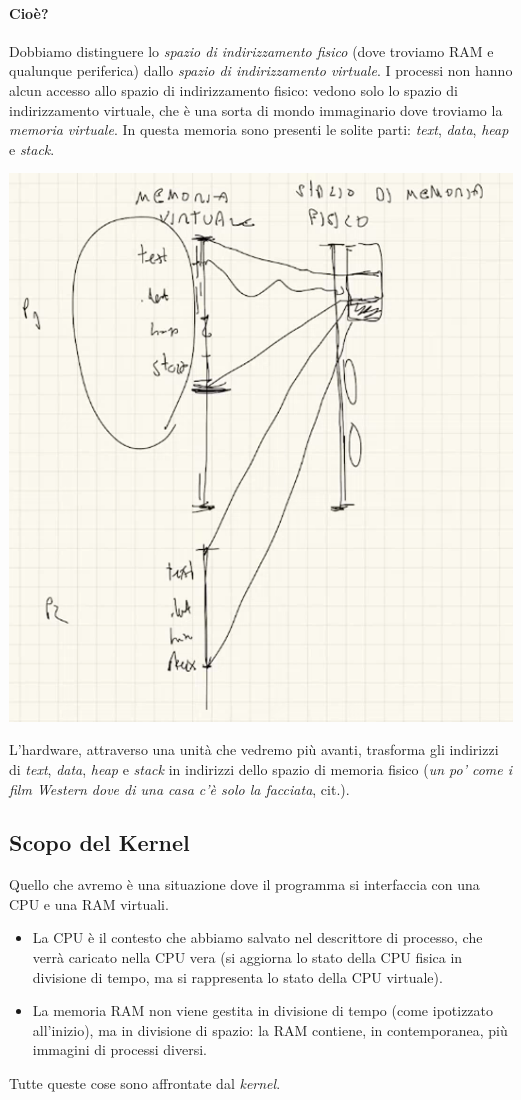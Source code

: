 \paragraph{Cioè?} Dobbiamo distinguere lo \emph{spazio di indirizzamento fisico} (dove troviamo RAM e qualunque periferica) dallo \emph{spazio di indirizzamento virtuale}. I processi non hanno alcun accesso allo spazio di indirizzamento fisico: vedono solo lo spazio di indirizzamento virtuale, che è una sorta di mondo immaginario dove troviamo la \emph{memoria virtuale}. In questa memoria sono presenti le solite parti: \emph{text}, \emph{data}, \emph{heap} e \emph{stack}.
\begin{center}
	\includegraphics[scale=.65]{img/209.PNG}
\end{center} 
L'hardware, attraverso una unità che vedremo più avanti, trasforma gli indirizzi di \emph{text}, \emph{data}, \emph{heap} e \emph{stack} in indirizzi dello spazio di memoria fisico (\textit{un po' come i film Western dove di una casa c'è solo la facciata}, cit.).
\subsection{Scopo del Kernel} Quello che avremo è una situazione dove il programma si interfaccia con una CPU e una RAM virtuali.
\begin{itemize}
	\item La CPU è il contesto che abbiamo salvato nel descrittore di processo, che verrà caricato nella CPU vera (si aggiorna lo stato della CPU fisica in divisione di tempo, ma si rappresenta lo stato della CPU virtuale).
	\item La memoria RAM non viene gestita in divisione di tempo (come ipotizzato all'inizio), ma in divisione di spazio: la RAM contiene, in contemporanea, più immagini di processi diversi.
\end{itemize} 
Tutte queste cose sono affrontate dal \emph{kernel}.

